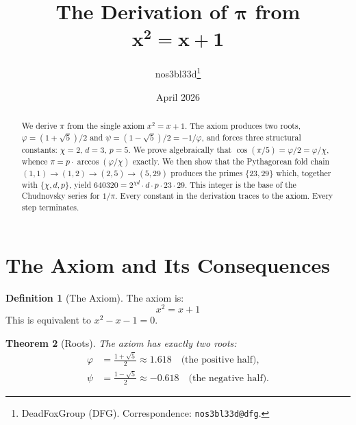 \documentclass[11pt,a4paper]{article}
\theoremstyle{plain}
\newtheorem{theorem}{Theorem}[section]
\theoremstyle{definition}
\newtheorem{definition}[theorem]{Definition}
\begin{document}
\title{%
  \textbf{The Derivation of $\boldsymbol{\pi}$ from}\\[4pt]
  $\boldsymbol{x^2 = x + 1}$%
}
\author{%
  nos3bl33d\thanks{%
    DeadFoxGroup (DFG). Correspondence: \texttt{nos3bl33d@dfg}.%
  }%
}
\date{April 2026}

\maketitle

\begin{abstract}
We derive $\pi$ from the single axiom $x^2 = x + 1$.
The axiom produces two roots, $\varphi = (1+\sqrt{5})/2$ and
$\psi = (1-\sqrt{5})/2 = -1/\varphi$, and forces three structural
constants: $\chi = 2$, $d = 3$, $p = 5$.
We prove algebraically that
$\cos(\pi/5) = \varphi/2 = \varphi/\chi$, whence
$\pi = p \cdot \arccos(\varphi/\chi)$ exactly.
We then show that the Pythagorean fold chain
$(1,1) \to (1,2) \to (2,5) \to (5,29)$ produces
the primes $\{23, 29\}$ which, together with $\{\chi, d, p\}$,
yield $640320 = 2^{\chi d} \cdot d \cdot p \cdot 23 \cdot 29$.
This integer is the base of the Chudnovsky series for $1/\pi$.
Every constant in the derivation traces to the axiom.
Every step terminates.
\end{abstract}

\tableofcontents

\section{The Axiom and Its Consequences}\label{sec:axiom}

\begin{definition}[The Axiom]\label{def:axiom}
The axiom is:
\begin{equation}\label{eq:axiom}
  \boxed{\; x^2 = x + 1 \;}
\end{equation}
This is equivalent to $x^2 - x - 1 = 0$.
\end{definition}

\begin{theorem}[Roots]\label{thm:roots}
The axiom has exactly two roots:
\begin{align}
  \varphi &= \frac{1 + \sqrt{5}}{2} \approx 1.618
  \quad\text{(the positive half),} \label{eq:phi} \\[4pt]
  \psi &= \frac{1 - \sqrt{5}}{2} \approx -0.618
  \quad\text{(the negative half).} \label{eq:psi}
\end{align}
\end{theorem}
\end{document}
